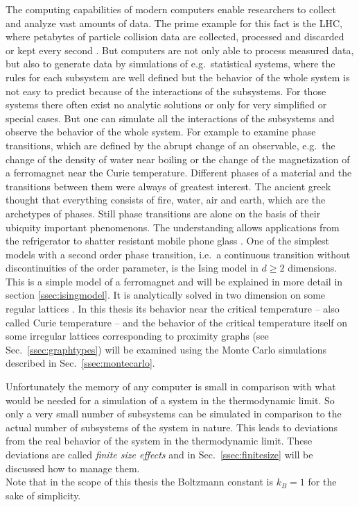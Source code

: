 The computing capabilities of modern computers enable researchers to
collect and analyze vast amounts of data. The prime example for this fact
is the LHC, where petabytes of particle collision data are collected,
processed and discarded or kept every second \cite{LHC}.
But computers are not only able to process measured data, but
also to generate data by simulations of e.g.\ statistical systems, where
the rules for each subsystem are well defined but the behavior of the
whole system is not easy to predict because of the interactions of the
subsystems. For those systems there often exist no analytic solutions
or only for very simplified or special cases. But one can simulate all
the interactions of the subsystems and observe the behavior of the whole
system.
For example to examine phase transitions, which are defined by the abrupt
change of an observable, e.g.\ the change of the density of water near
boiling or the change of the magnetization of a ferromagnet near the
Curie temperature.
Different phases of a material and the transitions between them were
always of greatest interest. The ancient greek thought that everything
consists of fire, water, air and earth, which are the archetypes of
phases. Still phase transitions are alone on the basis of their ubiquity
important phenomenons. The understanding allows applications from the
refrigerator to shatter resistant mobile phone glass \cite{PJournalGlass}.
One of the simplest models with a second order
phase transition, i.e.\ a continuous transition without discontinuities of
the order parameter, is the Ising model \cite{Ising1925} in \(d \ge 2\)
dimensions. This is a simple
model of a ferromagnet and will be explained in more detail in section
\ref{ssec:isingmodel}. It is analytically solved in two dimension on
some regular lattices \cite{Onsager1944} \cite{Wannier1945}.
In this thesis its behavior near the critical temperature -- also called
Curie temperature -- and the behavior of the critical temperature itself
on some irregular lattices corresponding to proximity graphs
(see Sec.\ \ref{ssec:graphtypes}) will be examined using the Monte
Carlo simulations described in Sec.\ \ref{ssec:montecarlo}.

Unfortunately the memory of any computer is small in comparison with what
would be needed for a simulation of a system in the
thermodynamic limit. So only a very small number of subsystems can be
simulated in comparison to the actual number of subsystems
of the system in nature. This leads to deviations from the real behavior
of the system in the thermodynamic limit. These deviations are called
\emph{finite size effects} and in Sec.\ \ref{ssec:finitesize} will be
discussed how to manage them.\\

Note that in the scope of this thesis the Boltzmann constant is \(k_{B}=1\)
for the sake of simplicity.
